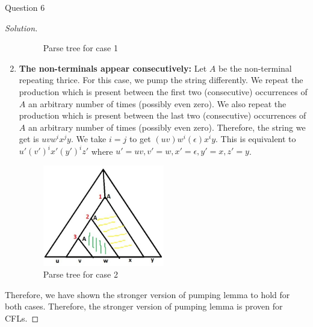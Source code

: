 \begin{solution}{Question 6}
\begin{proof}[Solution]
\begin{enumerate}
\begin{figure}[H]
            \caption{Parse tree for case 1}
        \end{figure}
        \item \textbf{The non-terminals appear consecutively:} Let $A$ be the non-terminal repeating thrice. For this case, we pump the string differently. We repeat the production which is present between the first two (consecutive) occurrences of $A$ an arbitrary number of times (possibly even zero). We also repeat the production which is present between the last two (consecutive) occurrences of $A$ an arbitrary number of times (possibly even zero). Therefore, the string we get is $uvw^ix^jy$. We take $i = j$ to get $(uv)w^i(\epsilon)x^iy$. This is equivalent to $u'(v')^ix'(y')^iz'$ where $u' = uv, v' = w, x' = \epsilon, y' = x, z' = y$.
        \begin{figure}[H]
            \centering
            \includegraphics[width=0.5\textwidth]{case 2.jpeg}
            \caption{Parse tree for case 2}
        \end{figure}
    \end{enumerate}
    Therefore, we have shown the stronger version of pumping lemma to hold for both cases. Therefore, the stronger version of pumping lemma is proven for CFLs.
    \end{proof}
\end{solution}
